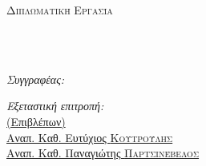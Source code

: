 \documentclass[
	12pt, %
	english, %
	onehalfspacing, %
	liststotoc, %
	toctotoc, %
	parskip, %
	headsepline, %
]{MastersDoctoralThesis} %
\author{Χρήστος \textsc{Σπυριδάκης}}
\begin{document}
\frontmatter %

\pagestyle{plain} %

\begin{titlepage}
	\begin{center}

		\vspace*{.01\textheight}
		{\scshape\LARGE \univname\par}\vspace{0.2cm} %
		\textsc{\Large Διπλωματική Εργασία}\\[0.15cm] %

		\HRule \\[0.3cm] %
		{\Large \bfseries \ttitle\par}\vspace{0.3cm} %
		\HRule \\[0.05cm] %

		\begin{minipage}[t]{0.32\textwidth}
			\begin{flushleft} \large
				\emph{Συγγραφέας:}\\
				\href{https://www.linkedin.com/in/cspyridakis}{\authorname} %
			\end{flushleft}
		\end{minipage}
		\begin{minipage}[t]{0.62\textwidth}
			\begin{flushright} \large
				\emph{Εξεταστική επιτροπή:} \\
				\href{https://www.ece.tuc.gr/index.php?id=4531&tx_tuclabspersonnel_list%5Bperson%5D=289&tx_tuclabspersonnel_list%5Baction%5D=person&tx_tuclabspersonnel_list%5Bcontroller%5D=List}{\supname \hspace{.1cm}(Επιβλέπων)}\\ %
				\href{https://www.ece.tuc.gr/index.php?id=4531&tx_tuclabspersonnel_list%5Bperson%5D=79&tx_tuclabspersonnel_list%5Baction%5D=person&tx_tuclabspersonnel_list%5Bcontroller%5D=List}{Αναπ. Καθ. Ευτύχιος \textsc{Κουτρούλης}}\\
				\href{https://www.tuc.gr/index.php?id=5643&tx_tuclabspersonnel_pi3%5Bpersonid%5D=347}{Αναπ. Καθ. Παναγιώτης \textsc{Παρτσινέβελος}}
			\end{flushright}
		\end{minipage}\\[0.42cm]


\end{center}
\end{titlepage}
\end{document}
